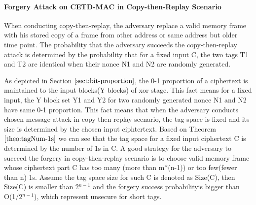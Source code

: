 %

\paragraph{Forgery Attack on CETD-MAC in Copy-then-Replay Scenario}
When conducting copy-then-replay, the adversary replace a valid memory frame with his stored copy of a frame from other address or same address but older time point. The probability that the adversary succeeds the copy-then-replay attack is determined by the probability that for a fixed input C, the two tags T1 and T2 are identical when their nonce N1 and N2 are randomly generated.

As depicted in Section $\ref{sect:bit-proportion}$, the 0-1 proportion of a ciphertext is maintained to the input blocks(Y blocks) of xor stage. This fact means for a fixed input, the Y block set Y1 and Y2 for two randomly generated nonce N1 and N2 have same 0-1 proportion. This fact means that when the adversary conducts chosen-message attack in copy-then-replay scenario, the tag space is fixed and its size is determined by the chosen input ciphtertext.  
Based on Theorem $\ref{theo:tagNum-1s}$ we can see that the tag space for a fixed input ciphertext C is determined by the number of 1s in C. A good strategy for the adversary to succeed the forgery in copy-then-replay scenario is to choose valid memory frame whose ciphertext part C has too many (more than m*(n-1)) or too few(fewer than n) 1s. Assume the tag space size for such C is denoted as Size(C), then Size(C) is smaller than 2$^{n-1}$ and the forgery success probabilityis bigger than O(1/2$^{n-1}$), which represent unsecure for short tags.


%
